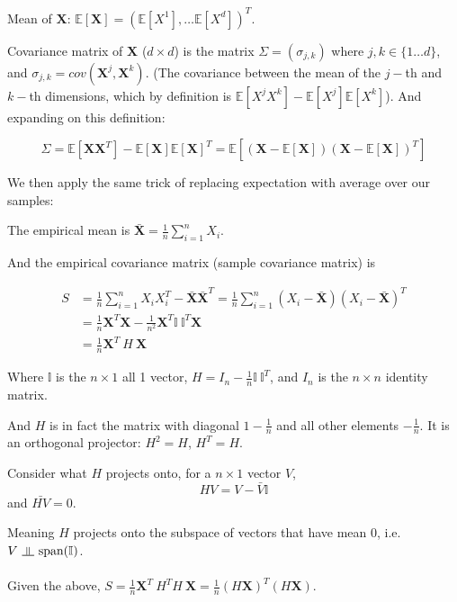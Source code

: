 \documentclass{article}
\newcommand{\indep}{\rotatebox[origin=c]{90}{$\models$}}
\begin{document}
Mean of $\mathbf{X}$: $\mathbb{E}[\mathbf{X}] = (\mathbb{E}[X^1], \dots \mathbb{E}[X^d])^T$.

Covariance matrix of $\mathbf{X}$ ($d \times d$) is the matrix $\Sigma = (\sigma_{j, k})$ where $j, k \in \{1 \dots d\}$,
and $\sigma_{j, k} = cov(\mathbf{X}^j, \mathbf{X}^k)$.
(The covariance between the mean of the $j-$th and $k-$th dimensions, which by definition is
$\mathbb{E}[X^j X^k] - \mathbb{E}[X^j] \mathbb{E}[X^k]$).
And expanding on this definition:

$$
\Sigma =
\mathbb{E}[\mathbf{X} \mathbf{X}^T] - \mathbb{E}[\mathbf{X}] \mathbb{E}[\mathbf{X}]^T =
\mathbb{E}[(\mathbf{X} - \mathbb{E}[\mathbf{X}]) (\mathbf{X} - \mathbb{E}[\mathbf{X}])^T]
$$

We then apply the same trick of replacing expectation with average over our samples:

The empirical mean is $\bar{\mathbf{X}} = \frac{1}{n} \sum_{i = 1}^{n} X_i$.

And the empirical covariance matrix (sample covariance matrix) is

\begin{align*}
  S &= \frac{1}{n} \sum_{i = 1}^{n} X_i X_i^T - \bar{\mathbf{X}} \bar{\mathbf{X}}^T =
  \frac{1}{n} \sum_{i = 1}^{n} (X_i - \bar{\mathbf{X}}) (X_i - \bar{\mathbf{X}})^T \\
  &= \frac{1}{n} \mathbf{X}^T \mathbf{X} - \frac{1}{n^2} \mathbf{X}^T \mathbb{I} ~ \mathbb{I}^T \mathbf{X} \\
  &= \frac{1}{n} \mathbf{X}^T ~ H ~ \mathbf{X}
\end{align*}

Where $\mathbb{I}$ is the $n \times 1$ all 1 vector,
$H = \mathit{I}_n - \frac{1}{n} \mathbb{I} ~ \mathbb{I}^T$, and
$\mathit{I}_n$ is the $n \times n$ identity matrix.

And $H$ is in fact the matrix with diagonal $1 - \frac{1}{n}$ and all other elements $-\frac{1}{n}$.
It is an orthogonal projector: $H^2 = H$, $H^T = H$.

Consider what $H$ projects onto, for a $n \times 1$ vector $V$,
$$
HV = V - \bar{V} \mathbb{I}
$$
and $\bar{HV} = 0$.

Meaning $H$ projects onto the subspace of vectors that have mean 0,
i.e. $V ~ \indep ~ \text{span}(\mathbb{I})$.
\\
\\
Given the above,
$S = \frac{1}{n} \mathbf{X}^T ~ H^T H ~ \mathbf{X} = \frac{1}{n} (H \mathbf{X})^T (H \mathbf{X})$.
\\
\\
\end{document}
